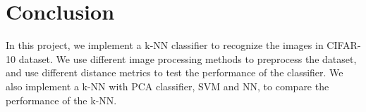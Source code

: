 \documentclass[11pt]{article}
\begin{document}
\section{Conclusion}

In this project, we implement a k-NN classifier to recognize the images in CIFAR-10 dataset. We use different image processing methods to preprocess the dataset, and use different distance metrics to test the performance of the classifier. We also implement a k-NN with PCA classifier, SVM and NN, to compare the performance of the k-NN.



\end{document}
